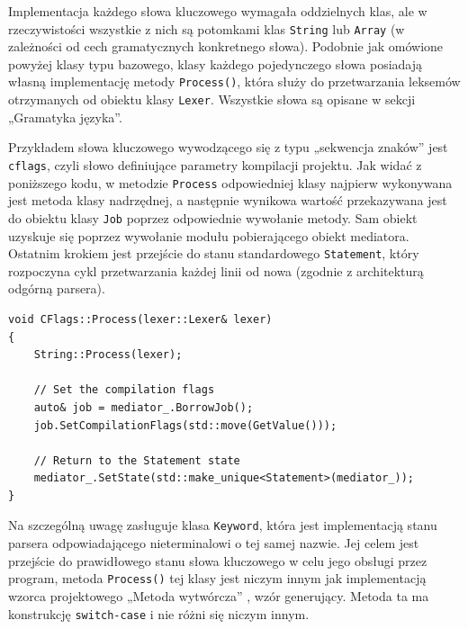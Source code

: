 Implementacja każdego słowa kluczowego wymagała oddzielnych klas, ale w rzeczywistości wszystkie z nich są potomkami klas \texttt{String} lub \texttt{Array} (w zależności od cech gramatycznych konkretnego słowa). Podobnie jak omówione powyżej klasy typu bazowego, klasy każdego pojedynczego słowa posiadają własną implementację metody \texttt{Process()}, która służy do przetwarzania leksemów otrzymanych od obiektu klasy \texttt{Lexer}. Wszystkie słowa są opisane w sekcji „Gramatyka języka”.

Przykładem słowa kluczowego wywodzącego się z typu „sekwencja znaków” jest \texttt{cflags}, czyli słowo definiujące parametry kompilacji projektu. Jak widać z poniższego kodu, w metodzie \texttt{Process} odpowiedniej klasy najpierw wykonywana jest metoda klasy nadrzędnej, a następnie wynikowa wartość przekazywana jest do obiektu klasy \texttt{Job} poprzez odpowiednie wywołanie metody. Sam obiekt uzyskuje się poprzez wywołanie modułu pobierającego obiekt mediatora. Ostatnim krokiem jest przejście do stanu standardowego \texttt{Statement}, który rozpoczyna cykl przetwarzania każdej linii od nowa (zgodnie z architekturą odgórną parsera).

\begin{lstlisting}[label=list:cflags,caption=Metoda CFlags::Process(),basicstyle=\footnotesize\ttfamily]
void CFlags::Process(lexer::Lexer& lexer)
{
    String::Process(lexer);

    // Set the compilation flags
    auto& job = mediator_.BorrowJob();
    job.SetCompilationFlags(std::move(GetValue()));

    // Return to the Statement state
    mediator_.SetState(std::make_unique<Statement>(mediator_));
}
\end{lstlisting}
    
Na szczególną uwagę zasługuje klasa \texttt{Keyword}, która jest implementacją stanu parsera odpowiadającego nieterminalowi o tej samej nazwie. Jej celem jest przejście do prawidłowego stanu słowa kluczowego w celu jego obsługi przez program, metoda \texttt{Process()} tej klasy jest niczym innym jak implementacją wzorca projektowego „Metoda wytwórcza'' \cite{factory-method}, wzór generujący. Metoda ta ma konstrukcję \texttt{switch-case} i nie różni się niczym innym.

